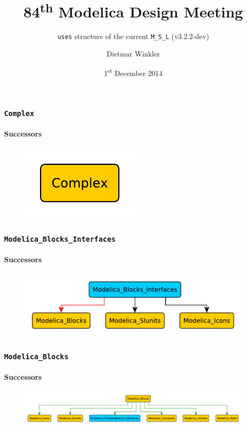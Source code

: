 \documentclass[aspectratio=1610]{beamer}
\title{84\textsuperscript{th} Modelica Design Meeting}
\subtitle{\texttt{uses} structure of the current \texttt{M\_S\_L} (v3.2.2-dev)}
\author{Dietmar Winkler}
\institute{Telemark University College}
\date{1\textsuperscript{st} December 2014}
\begin{document}
\maketitle

\begin{frame}
  \frametitle{\texttt{Complex}}
  \framesubtitle{Successors}
  \begin{figure}
      \includegraphics[width=\textwidth]{Complex}
  \end{figure}
\end{frame}

\begin{frame}
  \frametitle{\texttt{Modelica\_Blocks\_Interfaces}}
  \framesubtitle{Successors}
  \begin{figure}
      \includegraphics[width=\textwidth]{Modelica_Blocks_Interfaces}
  \end{figure}
\end{frame}

\begin{frame}
  \frametitle{\texttt{Modelica\_Blocks}}
  \framesubtitle{Successors}
  \begin{figure}
      \includegraphics[width=\textwidth]{Modelica_Blocks}
  \end{figure}
\end{frame}
\end{document}
